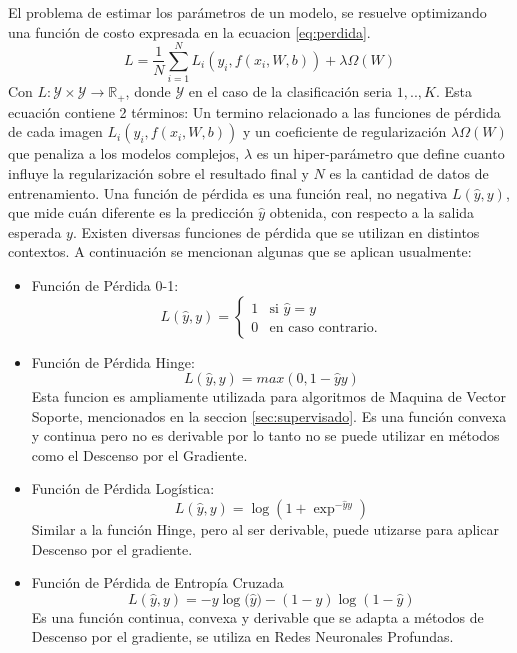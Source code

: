\documentclass[a4paper,11pt,spanish]{book}
\begin{document}
	  El problema de estimar los parámetros de un modelo, se resuelve optimizando una función de costo expresada en la ecuacion \eqref{eq:perdida}.
          \begin{equation}\label{eq:perdida}
	    L = \frac{1}{N}\sum_{i=1}^{N} L_i(y_i, f(x_i, W, b)) + \lambda \Omega(W)
          \end{equation}
          Con $L:\mathcal{Y}\times \mathcal{Y}\rightarrow\mathbb{R}_+$, donde $\mathcal{Y}$ en el caso de la clasificación seria ${1,..,K}$.
          Esta ecuación contiene 2 términos: Un termino relacionado a las funciones de pérdida de cada imagen $L_i(y_i, f(x_i, W, b))$
          y un coeficiente de regularización $\lambda \Omega(W)$ que penaliza a los modelos complejos, $\lambda$ es un hiper-parámetro que define cuanto influye la regularización
          sobre el resultado final y $N$ es la cantidad de datos de entrenamiento.
	  Una función de pérdida es una función real, no negativa $L({\widehat y}, y)$, que mide cuán diferente es la predicción ${\widehat y}$ obtenida, con respecto a la
	  salida esperada $y$. Existen diversas funciones de pérdida que se utilizan en distintos contextos. A continuación se mencionan algunas que se aplican usualmente:
	  \begin{itemize}
	    \item Función de Pérdida 0-1:
	      \begin{equation*}
		L({\widehat y}, y) =  \begin{cases}
					    1 & \text{si ${\widehat y} = y$} \\
					    0 & \text{en caso contrario.}
		                      \end{cases}
	      \end{equation*}
	    \item Función de Pérdida Hinge:
	      \begin{equation*}
		L({\widehat y}, y) =  max(0, 1 - {\widehat y}y)
	      \end{equation*}
	      Esta funcion es ampliamente utilizada para algoritmos de Maquina de Vector Soporte, mencionados en la seccion \ref{sec:supervisado}.
	      Es una función convexa y continua pero no es derivable por lo tanto no se puede utilizar en métodos como el Descenso por el Gradiente.
	    \item Función de Pérdida Logística:
	      \begin{equation*}
		L({\widehat y}, y) =  {\log(1+ {\exp^{-{\widehat y}y}})}
	      \end{equation*}
	      Similar a la función Hinge, pero al ser derivable, puede utizarse para aplicar Descenso por el gradiente.
	    \item Función de Pérdida de Entropía Cruzada
	      \begin{equation} \label{eq:cross_entropy}
		L({\widehat y}, y) = -y{\log({\widehat y}}) - (1-y) {\log(1-{\widehat y})}
	      \end{equation}
	      Es una función continua, convexa y derivable que se adapta a métodos de Descenso por el gradiente, se utiliza en Redes Neuronales Profundas.

	  \end{itemize}
\iffalse
\end{document}
